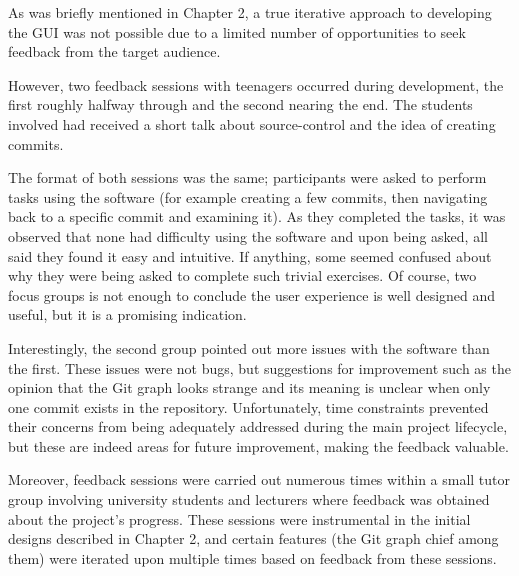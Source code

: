 As was briefly mentioned in Chapter 2, a true iterative approach to developing the GUI was not possible due to a limited number of opportunities to seek feedback from the target audience. 

However, two feedback sessions with teenagers occurred during development, the first roughly halfway through and the second nearing the end. The students involved had received a short talk about source-control and the idea of creating commits.

The format of both sessions was the same; participants were asked to perform tasks using the software (for example creating a few commits, then navigating back to a specific commit and examining it). As they completed the tasks, it was observed that none had difficulty using the software and upon being asked, all said they found it easy and intuitive. If anything, some seemed confused about why they were being asked to complete such trivial exercises. Of course, two focus groups is not enough to conclude the user experience is well designed and useful, but it is a promising indication.

Interestingly, the second group pointed out more issues with the software than the first. These issues were not bugs, but suggestions for improvement such as the opinion that the Git graph looks strange and its meaning is unclear when only one commit exists in the repository. Unfortunately, time constraints prevented their concerns from being adequately addressed during the main project lifecycle, but these are indeed areas for future improvement, making the feedback valuable.

Moreover, feedback sessions were carried out numerous times within a small tutor group involving university students and lecturers where feedback was obtained about the project's progress. These sessions were instrumental in the initial designs described in Chapter 2, and certain features (the Git graph chief among them) were iterated upon multiple times based on feedback from these sessions.


